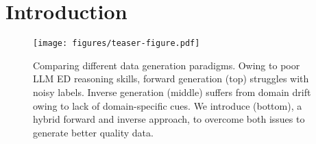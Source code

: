 \section{Introduction}

\begin{figure}[t]
    \centering
    \texttt{[image: figures/teaser-figure.pdf]}
    \caption{Comparing different data generation paradigms. Owing to poor LLM ED reasoning skills, forward generation (top) struggles with noisy labels. Inverse generation (middle) suffers from domain drift owing to lack of domain-specific cues. We introduce \modelName{} (bottom), a hybrid forward and inverse approach, to overcome both issues to generate better quality data.}
    \label{fig:teaser-figure}
\end{figure}




